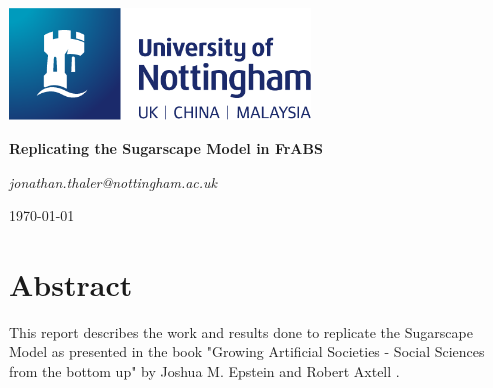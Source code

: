 \documentclass[oneside]{book}
\begin{document}
\begin{titlepage}
	\centering
	\includegraphics[width=0.60\textwidth]{../../logo/UoN_Primary_Logo_RGB.png}\par\vspace{1cm}
	\vspace{1.5cm}
	{\huge\bfseries Replicating the Sugarscape Model in FrABS \par}
	\vspace{2cm}
	{\Large\itshape jonathan.thaler@nottingham.ac.uk \par}
	\vfill
	
	\vfill

	{\large \today\par}
\end{titlepage}

\cleardoublepage

\section*{Abstract}
This report describes the work and results done to replicate the Sugarscape Model as presented in the book "Growing Artificial Societies - Social Sciences from the bottom up" by Joshua M. Epstein and Robert Axtell \cite{epstein_growing_1996}.

\clearpage
\tableofcontents
\clearpage











\renewcommand\bibname{References}



\end{document}
